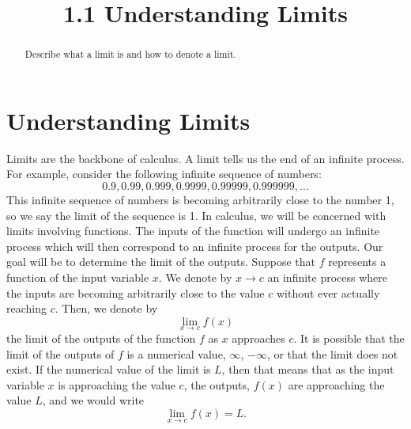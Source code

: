 \documentclass{ximera}
\title{1.1 Understanding Limits}
\begin{document}
\begin{abstract}
Describe what a limit is and how to denote a limit.
\end{abstract}

\maketitle

\section{Understanding Limits}









Limits are the backbone of calculus. A limit tells us the end of an infinite process. For example, consider the following infinite sequence of numbers:
\[ 0.9, 0.99, 0.999, 0.9999, 0.99999, 0.999999, ... \]
This infinite sequence of numbers is becoming arbitrarily close to the number 1, so we say the limit of the sequence is 1.
In calculus, we will be concerned with limits involving functions.
The inputs of the function will undergo an infinite process which will then correspond to an infinite process for the outputs.  Our goal will be to determine the limit of the outputs.
Suppose that $f$ represents a function of the input variable $x$.
We denote by $x \to c$ an infinite process where the inputs are becoming arbitrarily close to the value $c$ without ever actually reaching $c$.
Then, we denote by
\[ \lim_{x\to c} f(x) \]
the limit of the outputs of the function $f$ as $x$ approaches $c$.
It is possible that the limit of the outputs of $f$ is a numerical value, 
$\infty$, $-\infty$, or that the limit does not exist.
If the numerical value of the limit is $L$, then that means that as the input variable $x$ is approaching the value $c$, the outputs, $f(x)$ are approaching the value $L$, and we would write
\[ \lim_{x\to c} f(x) = L. \]
\end{document}
